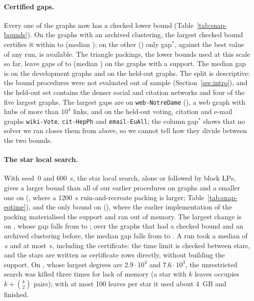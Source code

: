 \paragraph{Certified gaps.}  Every one of the \numSnapTotal{} graphs now has
a checked lower bound (Table~\ref{tab:snap-bounds}).  On the \numSnapGapN{}
graphs with an archived clustering, the largest checked bound certifies it
within \numSnapGapLo{} to \numSnapGapHi{} (median \numSnapGapMedian{}); on
the other \numSnapNoArch{} (\numSnapNoArchList{}) only gap$^*$, against the
best value of any run, is available.  The triangle packings, the lower
bounds used at this scale so far, leave gaps of \numBaseGapLo{} to
\numBaseGapHi{} (median \numBaseGapMedian{}) on the graphs with a support.
The median gap is \numSnapGapMedDev{} on the development graphs and
\numSnapGapMedHeld{} on the held-out graphs.  The split is descriptive: the
bound procedures were not evaluated out of sample (Section~\ref{sec:intro}),
and the held-out set contains the denser social and citation networks and
four of the five largest graphs.  The largest gaps are on
\texttt{web-NotreDame} (\numSnapGapHi{}), a web graph with hubs of more than
$10^4$ links, and on the held-out voting, citation and e-mail graphs
\texttt{wiki-Vote}, \texttt{cit-HepPh} and \texttt{email-EuAll}; the column
gap$^*$ shows that no solver we ran closes them from above, so we cannot
tell how they divide between the two bounds.

\paragraph{The star local search.}  With seed~0 and \SI{600}{s}, the star
local search, alone or followed by block LPs, gives a larger bound than all of
our earlier procedures on \numSlsBetter{} graphs and a smaller one on
\numSlsBelow{} (\numSlsBelowList{}, where a \SI{1200}{s} ruin-and-recreate
packing is larger; Table~\ref{tab:snap-eqtime}), and the only bound on
\numSlsNew{} (\numSlsNewList{}), where the earlier implementation of the
packing materialised the support and ran out of memory.  The largest change
is on \numSlsTopGraph{}, whose gap falls from \numSlsTopOld{} to
\numSlsTopNew{}; over the \numSnapGapOldN{} graphs that had a checked bound
and an archived clustering before, the median gap falls from
\numSnapGapOldMedian{} to \numSnapGapSameMedian{}.  A run took a median of
\numSlsTimeMedian{}\,s and at most \numSlsTimeMax{}\,s, including the
certificate: the time limit is checked between stars, and the stars are
written as certificate rows directly, without building the support.  On
\numSlsKmaxList{}, whose largest degrees are $2.9\cdot10^4$ and
$7.6\cdot10^3$, the unrestricted search was killed three times for lack of
memory (a star with $k$ leaves occupies $k+\binom k2$ pairs); with at most
100 leaves per star it used about \SI{4}{GB} and finished.


